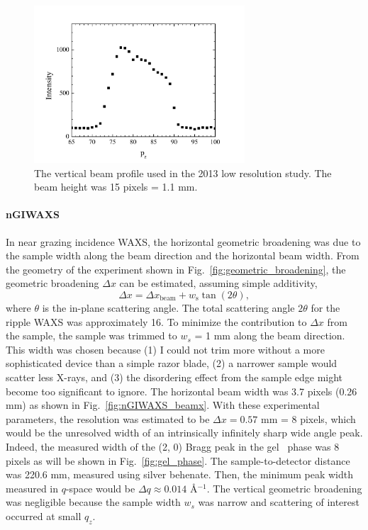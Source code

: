 \begin{figure}[p]
  \centering
  \includegraphics[width=0.7\textwidth]{figures/ripple/MMs/laxs/beamz_lr}
  \caption[The vertical beam profile used in the 2013 low resolution study]
  {The vertical beam profile used in the 2013 low resolution study.
  The beam height was 15 pixels = 1.1 mm.}
  \label{fig:ripple_lr_beamz}
\end{figure}

\paragraph{nGIWAXS}
In near grazing incidence WAXS, 
the horizontal geometric broadening was due to the
sample width along the beam direction and the horizontal beam width.
From the geometry of the experiment shown in Fig.~\ref{fig:geometric_broadening}, 
the geometric broadening $\Delta x$ can be estimated,
assuming simple additivity,
\[
\Delta x = \Delta x_\textrm{beam} + w_\textrm{s}\tan(2\theta),
\] 
where $\theta$ is the in-plane scattering angle.
The total scattering angle $2\theta$ for the ripple WAXS was approximately 
16\textdegree. 
To minimize the contribution to $\Delta x$ from the sample, 
the sample was trimmed to $w_s$ = 1 mm along the beam direction. 
This width was chosen because (1) I could not trim more
without a more sophisticated device than a simple razor blade, (2) a 
narrower sample would scatter less X-rays, and (3) the disordering effect from 
the sample edge might become too significant to ignore. 
The horizontal beam width was 3.7 pixels (0.26 mm) as shown in
Fig.~\ref{fig:nGIWAXS_beamx}.
With these experimental parameters, 
the resolution was estimated to be $\Delta x = 0.57$ mm = 8 pixels, 
which would be the unresolved width of an intrinsically infinitely sharp 
wide angle peak.
Indeed, the measured width of the (2, 0) Bragg peak in the gel \LbetaI\ phase
was 8 pixels as will be shown in Fig.~\ref{fig:gel_phase}.
The sample-to-detector distance was 220.6 mm, measured using silver behenate.
Then, the minimum peak width measured in $q$-space would be
$\Delta q \approx 0.014$ \AA$^{-1}$. The vertical geometric broadening 
was negligible because the sample width $w_s$ was narrow and scattering
of interest occurred at small $q_z$.

